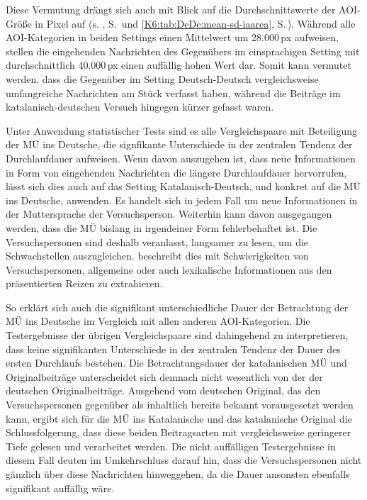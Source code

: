 Diese Vermutung drängt sich auch mit Blick auf die Durchschnittswerte der AOI-Größe in Pixel auf (s. , S.\,\pageref{K6:tab:CatDe:mean-sd-iaarea} und \ref{K6:tab:DeDe:mean-sd-iaarea}, S.\,\pageref{K6:tab:DeDe:mean-sd-iaarea}). Während alle AOI-Kategorien in beiden Settings einen Mittelwert um 28.000\,px aufweisen, stellen die eingehenden Nachrichten des Gegenübers im einsprachigen Setting mit durchschnittlich 40.000\,px einen auffällig hohen Wert dar. Somit kann vermutet werden, dass die Gegenüber im Setting Deutsch-Deutsch vergleichsweise umfangreiche Nachrichten am Stück verfasst haben, während die Beiträge im ka\-ta\-la\-nisch-deutschen Versuch hingegen kürzer gefasst waren.

Unter Anwendung statistischer Tests sind es alle Vergleichspaare mit Beteiligung der MÜ ins Deutsche, die signfikante Unterschiede in der zentralen Tendenz der Durchlaufdauer aufweisen. Wenn davon auszugehen ist, dass neue Informationen in Form von eingehenden Nachrichten die längere Durchlaufdauer hervorrufen, lässt sich dies auch auf das Setting Katalanisch-Deutsch, und konkret auf die MÜ ins Deutsche, anwenden. Es handelt sich in jedem Fall um neue Informationen in der Muttersprache der Versuchsperson. Weiterhin kann davon ausgegangen werden, dass die MÜ bislang in irgendeiner Form fehlerbehaftet ist. Die Versuchspersonen sind deshalb veranlasst, langsamer zu lesen, um die Schwachstellen auszugleichen. \citet[388]{holmqvist_eye_2011} beschreibt dies mit Schwierigkeiten von Versuchspersonen, allgemeine oder auch lexikalische Informationen aus den präsentierten Reizen zu extrahieren.

So erklärt sich auch die signifikant unterschiedliche Dauer der Betrachtung der MÜ ins Deutsche im Vergleich mit allen anderen AOI-Kategorien. Die Testergebnisse der übrigen Vergleichspaare sind dahingehend zu interpretieren, dass keine signifikanten Unterschiede in der zentralen Tendenz der Dauer des ersten Durchlaufs bestehen. Die Betrachtungsdauer der katalanischen MÜ und Originalbeiträge unterscheidet sich demnach nicht wesentlich von der der deutschen Originalbeiträge. Ausgehend vom deutschen Original, das den Versuchspersonen gegenüber als inhaltlich bereits bekannt vorausgesetzt werden kann, ergibt sich für die MÜ ins Katalanische und das katalanische Original die Schlussfolgerung, dass diese beiden Beitragsarten mit vergleichsweise geringerer Tiefe gelesen und verarbeitet werden. Die nicht auffälligen Testergebnisse in diesem Fall deuten im Umkehrschluss darauf hin, dass die Versuchspersonen nicht gänzlich über diese Nachrichten hinweggehen, da die Dauer ansonsten ebenfalls signifikant auffällig wäre.

